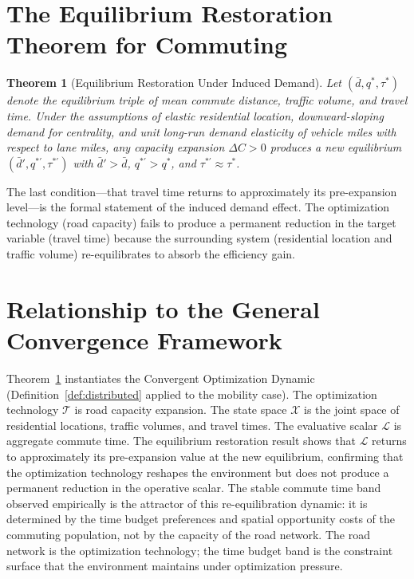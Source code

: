 \documentclass[12pt, oneside]{book}
\theoremstyle{plain}
\newtheorem{theorem}{Theorem}[chapter]
\theoremstyle{definition}
\theoremstyle{remark}
\theoremstyle{definition}
\begin{document}
\section{The Equilibrium Restoration Theorem for Commuting}

\begin{theorem}[Equilibrium Restoration Under Induced Demand]
\label{thm:induced}
Let $(\bar{d}, q^*, \tau^*)$ denote the equilibrium triple of mean commute distance,
traffic volume, and travel time. Under the assumptions of elastic residential
location, downward-sloping demand for centrality, and unit long-run demand
elasticity of vehicle miles with respect to lane miles, any capacity expansion
$\Delta C > 0$ produces a new equilibrium $(\bar{d}', q^{*'}, \tau^{*'})$ with
$\bar{d}' > \bar{d}$, $q^{*'} > q^*$, and $\tau^{*'} \approx \tau^*$.
\end{theorem}

The last condition---that travel time returns to approximately its pre-expansion
level---is the formal statement of the induced demand effect. The optimization
technology (road capacity) fails to produce a permanent reduction in the target
variable (travel time) because the surrounding system (residential location and
traffic volume) re-equilibrates to absorb the efficiency gain.

\section{Relationship to the General Convergence Framework}

Theorem~\ref{thm:induced} instantiates the Convergent Optimization Dynamic
(Definition~\ref{def:distributed} applied to the mobility case). The optimization
technology $\mathcal{T}$ is road capacity expansion. The state space $\mathcal{X}$
is the joint space of residential locations, traffic volumes, and travel times. The
evaluative scalar $\mathcal{L}$ is aggregate commute time. The equilibrium
restoration result shows that $\mathcal{L}$ returns to approximately its pre-expansion
value at the new equilibrium, confirming that the optimization technology reshapes
the environment but does not produce a permanent reduction in the operative scalar.
The stable commute time band observed empirically is the attractor of this
re-equilibration dynamic: it is determined by the time budget preferences and
spatial opportunity costs of the commuting population, not by the capacity of the
road network. The road network is the optimization technology; the time budget band
is the constraint surface that the environment maintains under optimization pressure.
\end{document}
